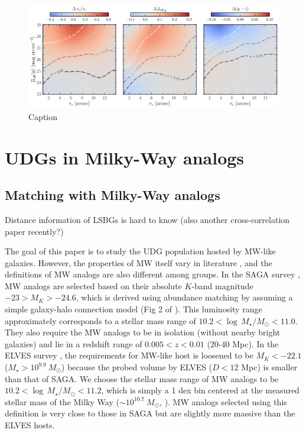 \documentclass[twocolumn,astrosymb,twocolappendix]{aastex631}
\begin{document}
\begin{CJK*}{UTF8}{gbsn}
\begin{figure}
	\vbox{ 
		\centering
		\includegraphics[width=1\linewidth]{meas_error_spergel.pdf}
	}
    \caption{Caption}
    \label{fig:meas_err}
\end{figure}

\section{UDGs in Milky-Way analogs}

\subsection{Matching with Milky-Way analogs}\label{sec:match}

Distance information of LSBGs is hard to know \citep{Kadowaki2021,Greene2022,Zaritsky2022} (also another cross-correlation paper recently?)

The goal of this paper is to study the UDG population hosted by MW-like galaxies. However, the properties of MW itself vary in literature \citep{Licquia2015,Bland-Hawthorn2016}, and the definitions of MW analogs are also different among groups. In the SAGA survey \citep{SAGA-I,SAGA-II}, MW analogs are selected based on their absolute $K$-band magnitude $-23 > M_K > -24.6$, which is derived using abundance matching by assuming a simple galaxy-halo connection model (Fig 2 of \citealt{SAGA-I}). This luminosity range approximately corresponds to a stellar mass range of $10.2 < \log\, M_\star/M_\odot < 11.0$. They also require the MW analogs to be in isolation (without nearby bright galaxies) and lie in a redshift range of $0.005 < z < 0.01$ (20-40 Mpc). In the ELVES survey \citep{ELVES-I,ELVES-II,CarlstenELVES2022}, the requirements for MW-like host is loosened to be $M_K < -22.1$ ($M_\star > 10^{9.9}\ M_\odot$) because the probed volume by ELVES ($D<12$ Mpc) is smaller than that of SAGA. We choose the stellar mass range of MW analogs to be $10.2 < \log\, M_\star/M_\odot < 11.2$, which is simply a 1 dex bin centered at the measured stellar mass of the Milky Way ($\sim 10^{10.7}\ M_\odot$, \citealt{Licquia2015}). MW analogs selected using this definition is very close to those in SAGA but are slightly more massive than the ELVES hosts.


\end{CJK*}
\end{document}
